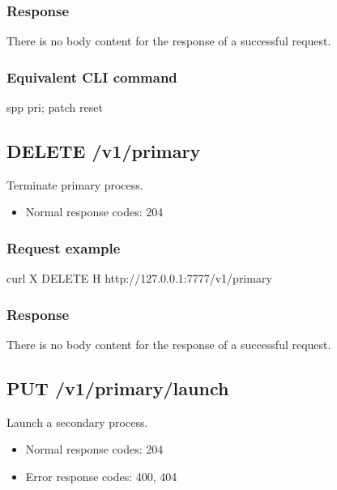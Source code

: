 \documentclass[a4paper,11pt,openany,oneside,english]{sphinxmanual}
\begin{document}
\subsubsection{Response}
\label{\detokenize{api_ref/spp_primary:id13}}
There is no body content for the response of a successful  request.


\subsubsection{Equivalent CLI command}
\label{\detokenize{api_ref/spp_primary:id14}}
\begin{sphinxVerbatim}[commandchars=\\\{\},formatcom=\footnotesize]
spp \PYGZgt{} pri; patch reset
\end{sphinxVerbatim}


\subsection{DELETE /v1/primary}
\label{\detokenize{api_ref/spp_primary:delete-v1-primary}}
Terminate primary process.
\begin{itemize}
\item {} 
Normal response codes: 204

\end{itemize}


\subsubsection{Request example}
\label{\detokenize{api_ref/spp_primary:id15}}
\begin{sphinxVerbatim}[commandchars=\\\{\},formatcom=\footnotesize]
 curl \PYGZhy{}X DELETE \PYGZhy{}H  
  http://127.0.0.1:7777/v1/primary
\end{sphinxVerbatim}


\subsubsection{Response}
\label{\detokenize{api_ref/spp_primary:id16}}
There is no body content for the response of a successful  request.


\subsection{PUT /v1/primary/launch}
\label{\detokenize{api_ref/spp_primary:put-v1-primary-launch}}
Launch a secondary process.
\begin{itemize}
\item {} 
Normal response codes: 204

\item {} 
Error response codes: 400, 404

\end{itemize}
\end{document}
